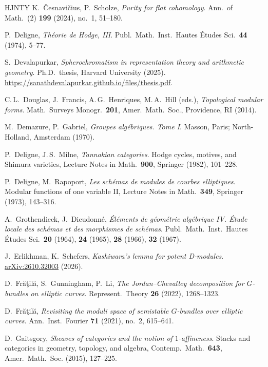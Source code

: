 \documentclass[12pt, oneside]{amsart}
\newcommand\arXiv[1]{\href{http://arxiv.org/abs/#1}{arXiv:#1}}
\numberwithin{equation}{section}
\theoremstyle{remark}
\theoremstyle{plain}
\begin{document}
\begin{thebibliography}{HJNTY}
   K.~\v{C}esnavi\v{c}ius, P.~Scholze, \textit{Purity for flat cohomology}. Ann.\ of Math.\ (2) {\bf{199}} (2024), no.~1, 51--180.

   P.~Deligne, \textit{Th\'eorie de Hodge, III}. Publ.\ Math.\ Inst.\ Hautes \'Etudes Sci.\ {\bf{44}} (1974), 5--77.

   S.~Devalapurkar, \textit{Spherochromatism in representation theory and arithmetic geometry}. Ph.D.\ thesis, Harvard University (2025). \href{https://sanathdevalapurkar.github.io/files/thesis.pdf}{https://sanathdevalapurkar.github.io/files/thesis.pdf}.

   C.\,L.~Douglas, J.~Francis, A.\,G.~Henriques, M.\,A.~Hill (eds.), \textit{Topological modular forms}. Math.\ Surveys Monogr.\ {\bf{201}}, Amer.\ Math.\ Soc., Providence, RI (2014).

   M.~Demazure, P.~Gabriel, \textit{Groupes alg\'ebriques. Tome I}. Masson, Paris; North-Holland, Amsterdam (1970).

   P.~Deligne, J.\,S.~Milne, \textit{Tannakian categories}. Hodge cycles, motives, and Shimura varieties, Lecture Notes in Math.\ {\bf{900}}, Springer (1982), 101--228.

   P.~Deligne, M.~Rapoport, \textit{Les sch\'emas de modules de courbes elliptiques}. Modular functions of one variable II, Lecture Notes in Math.\ {\bf{349}}, Springer (1973), 143--316.

   A.~Grothendieck, J.~Dieudonn\'e, \textit{\'El\'ements de g\'eom\'etrie alg\'ebrique IV. \'Etude locale des sch\'emas et des morphismes de sch\'emas}. Publ.\ Math.\ Inst.\ Hautes \'Etudes Sci.\ {\bf{20}} (1964), {\bf{24}} (1965), {\bf{28}} (1966), {\bf{32}} (1967).

   J.~Erlikhman, K.~Schefers, \textit{Kashiwara's lemma for potent D-modules}. \arXiv{2610.32003} (2026).

   D.~Fr\u{a}\c{t}il\u{a}, S.~Gunningham, P.~Li, \textit{The Jordan--Chevalley decomposition for $G$-bundles on elliptic curves}. Represent.\ Theory {\bf{26}} (2022), 1268--1323.

   D.~Fr\u{a}\c{t}il\u{a}, \textit{Revisiting the moduli space of semistable $G$-bundles over elliptic curves}. Ann.\ Inst.\ Fourier {\bf{71}} (2021), no.~2, 615--641.

   D.~Gaitsgory, \textit{Sheaves of categories and the notion of $1$-affineness}. Stacks and categories in geometry, topology, and algebra, Contemp.\ Math.\ {\bf{643}}, Amer.\ Math.\ Soc. (2015), 127--225.


\end{thebibliography}
\end{document}
